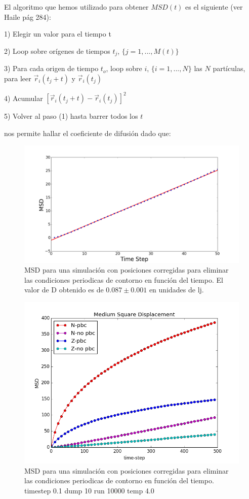 \documentclass[
 reprint,
 amsmath,amssymb,
 aps,
 a4paper
]{revtex4-1}
\begin{document}
El algoritmo que hemos utilizado para obtener $MSD(t)$ es el siguiente (ver Haile pág 284):

1) Elegir un valor para el tiempo t

2) Loop sobre orígenes de tiempos $t_j$, $\{j=1,...,M(t)\}$

3) Para cada origen de tiempo $t_o$, loop sobre $i$, $\{i=1,...,N\}$ las $N$ partículas, para leer $\vec{r}_i(t_j+t)$ y $\vec{r}_i(t_j)$

4) Acumular $[\vec{r}_i(t_{j}+t)-\vec{r}_i(t_{j})]^2$

5) Volver al paso (1) hasta barrer todos los $t$

 nos permite hallar el coeficiente de difusión dado que:

 

\begin{figure}[H]
\centerline{
  \includegraphics[width=1.0\linewidth]{msdvst.png}}
  \caption{\small MSD para una simulación con posiciones corregidas para eliminar las condiciones periodicas de contorno en función del tiempo. El valor de D obtenido es de $0.087 \pm 0.001$ en unidades de lj.}
  \label{fig:forcs}
\end{figure}

\begin{figure}[H]
\centerline{
  \includegraphics[width=1.0\linewidth]{msd.png}}
  \caption{\small MSD para una simulación con posiciones corregidas para eliminar las condiciones periodicas de contorno en función del tiempo. timestep 0.1 dump 10 run 10000 temp 4.0}
  \label{fig:msd_t400} 
\end{figure}
\end{document}

